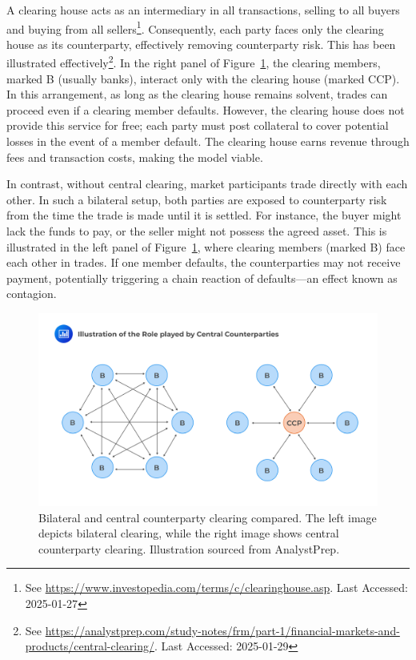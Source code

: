 A clearing house acts as an intermediary in all transactions, selling to all buyers and buying from all sellers\footnote{See \url{https://www.investopedia.com/terms/c/clearinghouse.asp}. Last Accessed: 2025-01-27}. Consequently, each party faces only the clearing house as its counterparty, effectively removing counterparty risk. This has been illustrated effectively\footnote{See \url{https://analystprep.com/study-notes/frm/part-1/financial-markets-and-products/central-clearing/}. Last Accessed: 2025-01-29}. In the right panel of Figure~\ref{fig:CCP}, the clearing members, marked B (usually banks), interact only with the clearing house (marked CCP). In this arrangement, as long as the clearing house remains solvent, trades can proceed even if a clearing member defaults. However, the clearing house does not provide this service for free; each party must post collateral to cover potential losses in the event of a member default. The clearing house earns revenue through fees and transaction costs, making the model viable.

In contrast, without central clearing, market participants trade directly with each other. In such a bilateral setup, both parties are exposed to counterparty risk from the time the trade is made until it is settled. For instance, the buyer might lack the funds to pay, or the seller might not possess the agreed asset. This is illustrated in the left panel of Figure~\ref{fig:CCP}, where clearing members (marked B) face each other in trades. If one member defaults, the counterparties may not receive payment, potentially triggering a chain reaction of defaults—an effect known as contagion.

\begin{figure}[ht]
    \centering
    \includegraphics[width=0.7\linewidth]{1Introduction/pictures/CCPvisual .jpg}
    \caption{Bilateral and central counterparty clearing compared. The left image depicts bilateral clearing, while the right image shows central counterparty clearing. Illustration sourced from AnalystPrep\protect\footnotemark[\value{footnote}].}
    \label{fig:CCP}
\end{figure}


